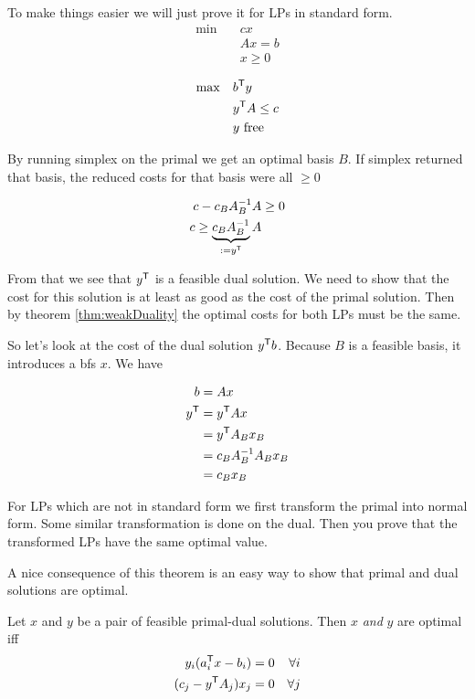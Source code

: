 \begin{pr} To make things easier we will just prove it for LPs in standard form.
\begin{align*}
\min \quad & cx\\
& Ax = b\\
&x\geq 0
\end{align*}

\begin{align*}
\max \quad &{b}^\text{\upshape \sffamily T}y\\
& {y}^\text{\upshape \sffamily T}A \leq c\\
& y \text{ free}
\end{align*}

By running simplex on the primal we get an optimal basis $B$. If simplex returned that basis, the reduced costs for that basis were all $\geq 0$

\begin{align*}
c-c_BA_B^{-1}A &\geq 0\\
c \geq \underbrace{c_BA_B^{-1}}_{:={y}^\text{\upshape \sffamily T}}A
\end{align*}

From that we see that ${y}^\text{\upshape \sffamily T}$ is a feasible dual solution. We need to show that the cost for this solution is at least as good as the cost of the primal solution. Then by theorem \ref{thm:weakDuality} the optimal costs for both LPs must be the same.

So let's look at the cost of the dual solution ${y}^\text{\upshape \sffamily T} b$. Because $B$ is a feasible basis, it introduces a bfs $x$. We have

\begin{align*}
b &= Ax\\
{y}^\text{\upshape \sffamily T} &= {y}^\text{\upshape \sffamily T} A x\\
 &={y}^\text{\upshape \sffamily T} A_B x_B\\
 &=c_B A_B^{-1}A_B x_B\\
 &=c_B x_B
 \end{align*}
 
 For LPs which are not in standard form we first transform the primal into normal form. Some similar transformation is done on the dual. Then you prove that the transformed LPs have the same optimal value.
\end{pr}

A nice consequence of this theorem is an easy way to show that primal and dual solutions are optimal.

\begin{thm} Let $x$ and $y$ be a pair of feasible primal-dual solutions. Then $x$ \emph{and} $y$ are optimal iff
\begin{align*}
y_i({a}^\text{\upshape \sffamily T}_ix-b_i) = 0 && \forall i\\ 
(c_j - {y}^\text{\upshape \sffamily T}A_j)x_j =0 && \forall j
\end{align*}
\end{thm}

